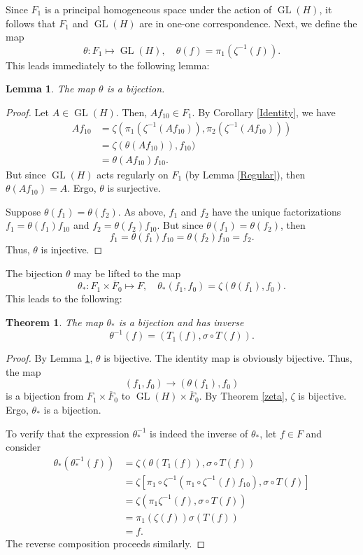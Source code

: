 \documentclass{article}
\newtheorem{lemma}[defn]{Lemma}
\newtheorem{thm}[defn]{Theorem}
\newcommand{\GL}{\operatorname{GL}}
\newcommand{\Fbar}{\overline{F}}
\begin{document}
Since $F_1$ is a principal homogeneous space under the action of $\GL(H)$, it follows that $F_1$ and $\GL(H)$ are in one-one correspondence. Next, we define the map
\begin{equation}
\theta:F_1\mapsto\GL(H), \quad
\theta(f) = \pi_1(\zeta^{-1}(f)).
\end{equation}
This leads immediately to the following lemma:
\begin{lemma} \label{theta}
The map $\theta$ is a bijection.
\end{lemma}
\begin{proof}
Let $A\in\GL(H)$. Then, $Af_{10}\in F_1$. By Corollary \ref{Identity}, we have
\begin{align*}
Af_{10} &= \zeta(\pi_1(\zeta^{-1}(Af_{10})), \pi_2(\zeta^{-1}(Af_{10}))) \\
&= \zeta(\theta(Af_{10})), f_{10}) \\
&= \theta(Af_{10})f_{10}.
\end{align*}
But since $\GL(H)$ acts regularly on $F_1$ (by Lemma \ref{Regular}), then $\theta(Af_{10})=A$. Ergo, $\theta$ is surjective.

Suppose $\theta(f_1) = \theta(f_2)$. As above, $f_1$ and $f_2$ have the unique factorizations $f_1=\theta(f_1)f_{10}$ and $f_2=\theta(f_2)f_{10}$. But since $\theta(f_1)=\theta(f_2)$, then
\[ f_1 = \theta(f_1)f_{10} = \theta(f_2)f_{10} = f_2. \]
Thus, $\theta$ is injective.
\end{proof}

The bijection $\theta$ may be lifted to the map
\begin{equation}
\theta_*:F_1\times\Fbar_0\mapsto F, \quad
\theta_*(f_1, f_0) = \zeta(\theta(f_1), f_0).
\end{equation}
This leads to the following: 
\begin{thm}
The map $\theta_*$ is a bijection and has inverse
\[ \theta^{-1}(f) = (T_1(f), \sigma\circ T(f)). \]
\end{thm}
\begin{proof}
By Lemma \ref{theta}, $\theta$ is bijective. The identity map is obviously bijective. Thus, the map
\[ (f_1,f_0)\rightarrow (\theta(f_1), f_0) \]
is a bijection from $F_1\times\Fbar_0$ to $\GL(H)\times\Fbar_0$. By Theorem \ref{zeta}, $\zeta$ is bijective. Ergo, $\theta_*$ is a bijection.

To verify that the expression $\theta_*^{-1}$ is indeed the inverse of $\theta_*$, let $f\in F$ and consider
\begin{align*}
\theta_*(\theta_*^{-1}(f))
&= \zeta(\theta(T_1(f)), \sigma\circ T(f)) \\
&= \zeta[\pi_1\circ\zeta^{-1}(\pi_1\circ\zeta^{-1}(f)f_{10}), \sigma\circ T(f)] \\
&= \zeta(\pi_1\zeta^{-1}(f), \sigma\circ T(f)) \\
&= \pi_1(\zeta(f))\sigma(T(f)) \\
&= f.
\end{align*}
The reverse composition proceeds similarly.
\end{proof}
\end{document}
